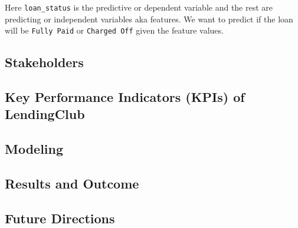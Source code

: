 \documentclass[
  letterpaper,
  DIV=11,
  numbers=noendperiod]{scrartcl}
\begin{document}
Here \texttt{loan\_status} is the predictive or dependent variable and
the rest are predicting or independent variables aka features. We want
to predict if the loan will be \texttt{Fully\ Paid} or
\texttt{Charged\ Off} given the feature values.

\subsection{Stakeholders}\label{stakeholders}

\subsection{Key Performance Indicators (KPIs) of
LendingClub}\label{key-performance-indicators-kpis-of-lendingclub}

\subsection{Modeling}\label{modeling}

\subsection{Results and Outcome}\label{results-and-outcome}

\subsection{Future Directions}\label{future-directions}


\printbibliography
\end{document}
